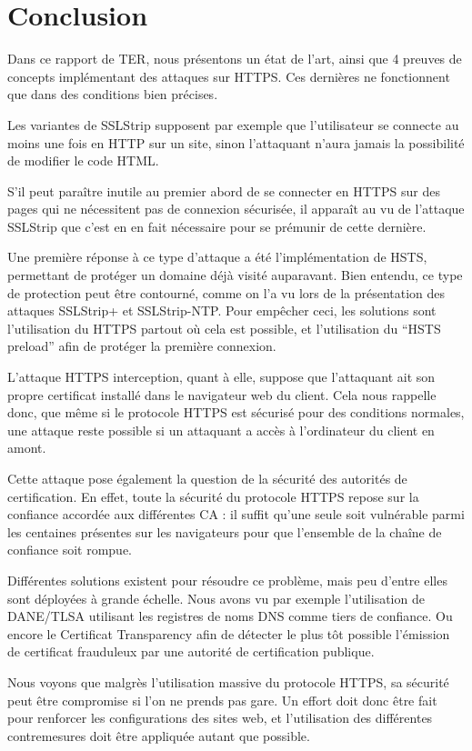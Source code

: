 \chapter*{Conclusion}


Dans ce rapport de TER, nous présentons un état de l'art, ainsi que 4 preuves de concepts implémentant des attaques sur HTTPS. Ces dernières ne fonctionnent que dans des conditions bien précises.

Les variantes de SSLStrip supposent par exemple que l'utilisateur se connecte au moins une fois en HTTP sur un site, sinon l'attaquant n'aura jamais la possibilité de modifier le code HTML.

S'il peut paraître inutile au premier abord de se connecter en HTTPS sur des pages qui ne nécessitent pas de connexion sécurisée, il apparaît au vu de l'attaque SSLStrip que c'est en en fait nécessaire pour se prémunir de cette dernière.

Une première réponse à ce type d'attaque a été l'implémentation de HSTS, permettant de protéger un domaine déjà visité auparavant. Bien entendu, ce type de protection peut être contourné, comme on l'a vu lors de la présentation des attaques SSLStrip+ et SSLStrip-NTP. Pour empêcher ceci, les solutions sont l'utilisation du HTTPS partout où cela est possible, et l'utilisation du ``HSTS preload'' afin de protéger la première connexion.

L'attaque HTTPS interception, quant à elle, suppose que l'attaquant ait son propre certificat installé dans le navigateur web du client. Cela nous rappelle donc, que même si le protocole HTTPS est sécurisé pour des conditions normales, une attaque reste possible si un attaquant a accès à l'ordinateur du client en amont.

Cette attaque pose également la question de la sécurité des autorités de certification. En effet, toute la sécurité du protocole HTTPS repose sur la confiance accordée aux différentes CA : il suffit qu'une seule soit vulnérable parmi les centaines présentes sur les navigateurs pour que l'ensemble de la chaîne de confiance soit rompue.

Différentes solutions existent pour résoudre ce problème, mais peu d'entre elles sont déployées à grande échelle. Nous avons vu par exemple l'utilisation de DANE/TLSA utilisant les registres de noms DNS comme tiers de confiance. Ou encore le Certificat Transparency afin de détecter le plus tôt possible l'émission de certificat frauduleux par une autorité de certification publique.

Nous voyons que malgrès l'utilisation massive du protocole HTTPS, sa sécurité peut être compromise si l'on ne prends pas gare. Un effort doit donc être fait pour renforcer les configurations des sites web, et l'utilisation des différentes contremesures doit être appliquée autant que possible.
